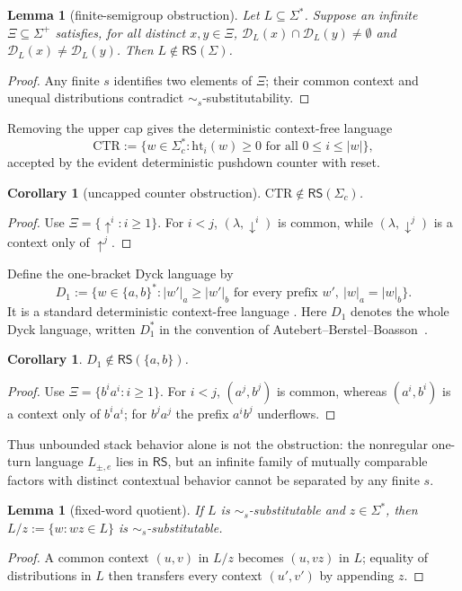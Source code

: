 \documentclass[11pt,a4paper]{article}
\newtheorem{lemma}[theorem]{Lemma}
\newtheorem{corollary}[theorem]{Corollary}
\theoremstyle{remark}
\theoremstyle{plain}
\newcommand{\D}{\mathcal{D}}
\begin{document}
\begin{lemma}[finite-semigroup obstruction]\label{lem:finite-monoid-obstruction}
Let $L\subseteq\Sigma^*$.  Suppose an infinite
$\Xi\subseteq\Sigma^+$ satisfies, for all distinct $x,y\in\Xi$,
$\D_L(x)\cap\D_L(y)\ne\emptyset$ and
$\D_L(x)\ne\D_L(y)$.  Then $L\notin\mathsf{RS}(\Sigma)$.
\end{lemma}
\begin{proof}
Any finite $s$ identifies two elements of $\Xi$; their common context and
unequal distributions contradict $\sim_s$-substitutability.
\end{proof}

Removing the upper cap gives the deterministic context-free language
\[
\mathrm{CTR}:=
\{w\in\Sigma_c^*: \mathrm{ht}_i(w)\ge0
\text{ for all }0\le i\le|w|\},
\]
accepted by the evident deterministic pushdown counter with reset.

\begin{corollary}[uncapped counter obstruction]
$\mathrm{CTR}\notin\mathsf{RS}(\Sigma_c)$.
\end{corollary}
\begin{proof}
Use $\Xi=\{\uparrow^i:i\ge1\}$.  For $i<j$,
$(\lambda,\downarrow^i)$ is common, while
$(\lambda,\downarrow^j)$ is a context only of $\uparrow^j$.
\end{proof}

Define the one-bracket Dyck language by
\[
 D_1:=\{w\in\{a,b\}^*: |w'|_a\ge|w'|_b
 \text{ for every prefix }w',\ |w|_a=|w|_b\}.
\]
It is a standard deterministic context-free language
\cite{ginsburg-greibach1966}.
Here $D_1$ denotes the whole Dyck language, written $D_1^*$
in the convention of Autebert--Berstel--Boasson~\cite{autebert1997}.

\begin{corollary}\label{cor:dyck-not-rs}
$D_1\notin\mathsf{RS}(\{a,b\})$.
\end{corollary}
\begin{proof}
Use $\Xi=\{b^ia^i:i\ge1\}$.  For $i<j$,
$(a^j,b^j)$ is common, whereas $(a^i,b^i)$ is a context only of
$b^ia^i$; for $b^ja^j$ the prefix $a^ib^j$ underflows.
\end{proof}

Thus unbounded stack behavior alone is not the obstruction: the nonregular
one-turn language $L_{\pm,e}$ lies in $\mathsf{RS}$, but an infinite family
of mutually comparable factors with distinct contextual behavior cannot be
separated by any finite $s$.

\begin{lemma}[fixed-word quotient]\label{lem:rs-fixed-quotient}
If $L$ is $\sim_s$-substitutable and $z\in\Sigma^*$, then
$L/z:=\{w:wz\in L\}$ is $\sim_s$-substitutable.
\end{lemma}
\begin{proof}
A common context $(u,v)$ in $L/z$ becomes $(u,vz)$ in $L$;
equality of distributions in $L$ then transfers every
context $(u',v')$ by appending $z$.
\end{proof}
\end{document}
